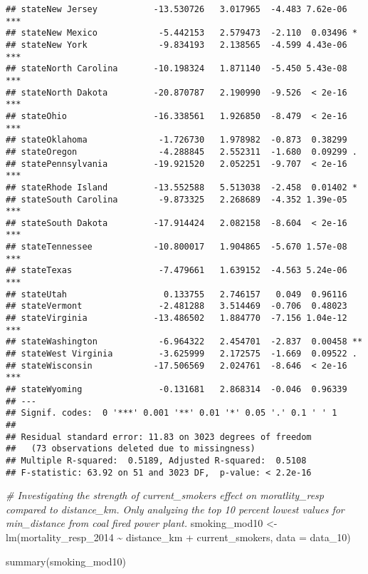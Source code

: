 \documentclass[
]{article}
\newenvironment{Shaded}{\begin{snugshade}}{\end{snugshade}}
\newcommand{\AttributeTok}[1]{\textcolor[rgb]{0.77,0.63,0.00}{#1}}
\newcommand{\CommentTok}[1]{\textcolor[rgb]{0.56,0.35,0.01}{\textit{#1}}}
\newcommand{\FunctionTok}[1]{\textcolor[rgb]{0.00,0.00,0.00}{#1}}
\newcommand{\NormalTok}[1]{#1}
\newcommand{\OtherTok}[1]{\textcolor[rgb]{0.56,0.35,0.01}{#1}}
\newcommand{\SpecialCharTok}[1]{\textcolor[rgb]{0.00,0.00,0.00}{#1}}
\begin{document}
\begin{verbatim}
## stateNew Jersey           -13.530726   3.017965  -4.483 7.62e-06 ***
## stateNew Mexico            -5.442153   2.579473  -2.110  0.03496 *  
## stateNew York              -9.834193   2.138565  -4.599 4.43e-06 ***
## stateNorth Carolina       -10.198324   1.871140  -5.450 5.43e-08 ***
## stateNorth Dakota         -20.870787   2.190990  -9.526  < 2e-16 ***
## stateOhio                 -16.338561   1.926850  -8.479  < 2e-16 ***
## stateOklahoma              -1.726730   1.978982  -0.873  0.38299    
## stateOregon                -4.288845   2.552311  -1.680  0.09299 .  
## statePennsylvania         -19.921520   2.052251  -9.707  < 2e-16 ***
## stateRhode Island         -13.552588   5.513038  -2.458  0.01402 *  
## stateSouth Carolina        -9.873325   2.268689  -4.352 1.39e-05 ***
## stateSouth Dakota         -17.914424   2.082158  -8.604  < 2e-16 ***
## stateTennessee            -10.800017   1.904865  -5.670 1.57e-08 ***
## stateTexas                 -7.479661   1.639152  -4.563 5.24e-06 ***
## stateUtah                   0.133755   2.746157   0.049  0.96116    
## stateVermont               -2.481288   3.514469  -0.706  0.48023    
## stateVirginia             -13.486502   1.884770  -7.156 1.04e-12 ***
## stateWashington            -6.964322   2.454701  -2.837  0.00458 ** 
## stateWest Virginia         -3.625999   2.172575  -1.669  0.09522 .  
## stateWisconsin            -17.506569   2.024761  -8.646  < 2e-16 ***
## stateWyoming               -0.131681   2.868314  -0.046  0.96339    
## ---
## Signif. codes:  0 '***' 0.001 '**' 0.01 '*' 0.05 '.' 0.1 ' ' 1
## 
## Residual standard error: 11.83 on 3023 degrees of freedom
##   (73 observations deleted due to missingness)
## Multiple R-squared:  0.5189, Adjusted R-squared:  0.5108 
## F-statistic: 63.92 on 51 and 3023 DF,  p-value: < 2.2e-16
\end{verbatim}

\begin{Shaded}
\begin{Highlighting}[]
\CommentTok{\# Investigating the strength of current\_smokers effect on moratlity\_resp compared to distance\_km. Only analyzing the top 10 percent lowest values for min\_distance from coal fired power plant. }
\NormalTok{smoking\_mod10 }\OtherTok{\textless{}{-}} \FunctionTok{lm}\NormalTok{(mortality\_resp\_2014 }\SpecialCharTok{\textasciitilde{}}\NormalTok{ distance\_km }\SpecialCharTok{+}\NormalTok{ current\_smokers, }\AttributeTok{data =}\NormalTok{ data\_10)}

\FunctionTok{summary}\NormalTok{(smoking\_mod10)}
\end{Highlighting}
\end{Shaded}
\end{document}
